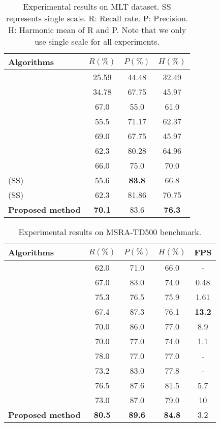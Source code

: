 \documentclass{article}
\begin{document}
\begin{table}[!t]
\centering
\small
\begin{tabular}{lccc}
  \hline
  Algorithms  & $R (\%)$  & $P (\%)$ & $H (\%)$ \\
  \hline
  \cite{nayef2017icdar2017} & 25.59 & 44.48 & 32.49 \\
  \cite{nayef2017icdar2017} & 34.78 & 67.75 & 45.97 \\
  \cite{ma2018arbitrary} & 67.0 & 55.0 & 61.0 \\
  \cite{ma2018arbitrary} & 55.5 & 71.17 & 62.37 \\
  \cite{nayef2017icdar2017} & 69.0 & 67.75 & 45.97 \\
  \cite{nayef2017icdar2017} & 62.3 & 80.28 & 64.96 \\
  \cite{zhong2018anchor} & 66.0 & 75.0 & 70.0 \\
  \cite{lyu2018multi} (SS) & 55.6 & \bf 83.8 & 66.8 \\
  \cite{liu2018fots} (SS) & 62.3 & 81.86 & 70.75 \\
  \hline
  {\bf Proposed method} & \bf 70.1 & 83.6 & \bf 76.3 \\
  \hline
\end{tabular}
\caption{Experimental results on MLT dataset. SS represents single scale. R: Recall rate. P: Precision. H: Harmonic mean of R and P. Note that we only use single scale for all experiments. }
\label{tab:mlt}
\end{table}

\begin{table}[!t]
\centering
\small
\begin{tabular}{lcccc}
  \hline
  Algorithms  & $R (\%)$  & $P (\%)$ & $H (\%)$  & FPS\\
  \hline
  \cite{kang2014orientation} & 62.0 & 71.0 & 66.0 & - \\
  \cite{zhang2016multi} & 67.0 & 83.0 & 74.0 & 0.48 \\
  \cite{yao2016scene} & 75.3 & 76.5 & 75.9 & 1.61 \\
  \cite{zhou2017east} & 67.4 & 87.3 & 76.1 & {\bf 13.2} \\
  \cite{shi2017detecting} & 70.0 & 86.0 & 77.0 & 8.9 \\
  \cite{he2017deep} & 70.0 & 77.0 & 74.0 & 1.1 \\
  \cite{wu2017self} & 78.0 & 77.0 & 77.0 & - \\
  \cite{deng2018pixellink} & 73.2 & 83.0 & 77.8 & - \\
  \cite{lyu2018multi} & 76.5 & 87.6 & 81.5 & 5.7 \\
  \cite{liao2018rotation} & 73.0 & 87.0 & 79.0 & 10 \\
  \hline
  {\bf Proposed method} & {\bf 80.5} & \bf 89.6 & \bf 84.8 & 3.2\\
  \hline
\end{tabular}
\caption{Experimental results on MSRA-TD500 benchmark.}
\label{tab:msra}
\end{table}
\end{document}
